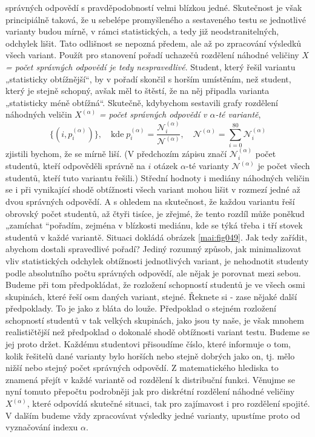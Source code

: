 \begin{mdframed}[style=mdexam]
\begin{example}
    správných odpovědí s pravděpodobností velmi blízkou jedné. Skutečnost je však principiálně
    taková, že u sebelépe promyšleného a sestaveného testu se jednotlivé varianty budou mírně, v
    rámci statistických, a tedy již neodstranitelných, odchylek lišit. Tato odlišnost se nepozná
    předem, ale až po zpracování výsledků všech variant. Použít pro stanovení pořadí uchazečů
    rozdělení náhodné veličiny \(X\) \emph{= počet správných odpovědí je tedy nespravedlivé}.
    Student, který řešil variantu „statisticky obtížnější“, by v pořadí skončil s horším umístěním,
    než student, který je stejně schopný, avšak měl to štěstí, že na něj připadla varianta
    „statisticky méně obtížná“. Skutečně, kdybychom sestavili grafy rozdělení náhodných veličin
    \(X^{(\alpha)}\) \emph{= počet správných odpovědí v \(\alpha\)-té variantě},
    \begin{equation*}
      \lbrace(i,p_i^{(\alpha)})\rbrace,\quad\text{kde}\; 
      p_i^{(\alpha)} = \dfrac{\mathcal{N}_i^{(\alpha)}}{\mathcal{N}^{(\alpha)}}, \quad
      \mathcal{N}^{(\alpha)} = \sum_{i=0}^{80}\mathcal{N}_i^{(\alpha)}
    \end{equation*}
    zjistili bychom, že se mírně liší. (V předchozím zápisu značí \(\mathcal{N}_i^{(\alpha)}\) počet
    studentů, kteří odpověděli správně na \(i\) otázek \(\alpha\)-té varianty
    \(\mathcal{N}^{(\alpha)}\) je počet všech studentů, kteří tuto variantu řešili.) Střední hodnoty
    i mediány náhodných veličin se i při vynikající shodě obtížnosti všech variant mohou lišit v
    rozmezí jedné až dvou správných odpovědí. A s ohledem na skutečnost, že každou variantu řeší
    obrovský počet studentů, až čtyři tisíce, je zřejmé, že tento rozdíl může poněkud „zamíchat
    “pořadím, zejména v blízkosti mediánu, kde se týká třeba i tří stovek studentů v každé variantě.
    Situaci dokládá obrázek \ref{mai:fig049}. Jak tedy zařídit, abychom dostali spravedlivé pořadí?
    Jediný rozumný způsob, jak minimalizovat vliv statistických odchylek obtížnosti jednotlivých
    variant, je nehodnotit studenty podle absolutního počtu správných odpovědí, ale nějak je
    porovnat mezi sebou. Budeme při tom předpokládat, že rozložení schopností studentů je ve všech
    osmi skupinách, které řeší osm daných variant, stejné. Řeknete si - zase nějaké další
    předpoklady. To je jako z bláta do louže. Předpoklad o stejném rozložení schopností studentů v
    tak velkých skupinách, jako jsou ty naše, je však mnohem realističtější než předpoklad o
    dokonalé shodě obtížnosti variant testu. Budeme se jej proto držet. Každému studentovi
    přisoudíme číslo, které informuje o tom, kolik řešitelů dané varianty bylo horších nebo stejně
    dobrých jako on, tj. mělo nižší nebo stejný počet správných odpovědí. Z matematického hlediska
    to znamená přejít v každé variantě od rozdělení k distribuční funkci. Věnujme se nyní tomuto
    přepočtu podrobněji jak pro diskrétní rozdělení náhodné veličiny \(X^{(\alpha)}\), které
    odpovídá skutečné situaci, tak pro zajímavost i pro rozdělení spojité. V dalším budeme vždy
    zpracovávat výsledky jedné varianty, upustíme proto od vyznačování indexu \(\alpha\).


\end{example}
\end{mdframed}
